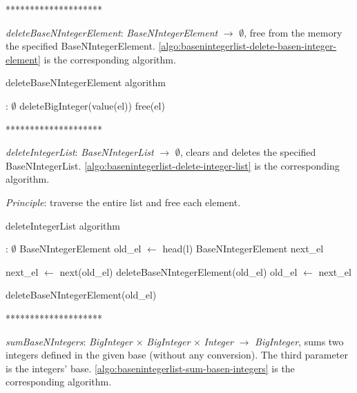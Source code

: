 \documentclass[book, nodocumentinfo]{upmethodology-document}
\newcommand{\separator}{\centerline{********************}}
\begin{document}
\separator

\emph{deleteBaseNIntegerElement}: \emph{BaseNIntegerElement} \(\rightarrow\) \(\emptyset\),
free from the memory the specified BaseNIntegerElement.
\ref{algo:basenintegerlist-delete-basen-integer-element} is the corresponding algorithm.

\begin{algorithm}[H]
    \caption{deleteBaseNIntegerElement algorithm}
    \label{algo:basenintegerlist-delete-basen-integer-element}

    \begin{algorithmic}
         : \(\emptyset\)
            \State deleteBigInteger(value(el))
            \State free(el)
        \EndFunction
    \end{algorithmic}
\end{algorithm}

\separator

\emph{deleteIntegerList}: \emph{BaseNIntegerList} \(\rightarrow\) \(\emptyset\),
clears and deletes the specified BaseNIntegerList.
\ref{algo:basenintegerlist-delete-integer-list} is the corresponding algorithm.

\emph{Principle}: traverse the entire list and free each element.

\newpage

\begin{algorithm}[H]
    \caption{deleteIntegerList algorithm}
    \label{algo:basenintegerlist-delete-integer-list}

    \begin{algorithmic}
         : \(\emptyset\)
                \State BaseNIntegerElement old\_el \(\leftarrow\) head(l)
                \State BaseNIntegerElement next\_el

                    \State next\_el \(\leftarrow\) next(old\_el)
                    \State deleteBaseNIntegerElement(old\_el)
                    \State old\_el \(\leftarrow\) next\_el
                \EndWhile

                \State deleteBaseNIntegerElement(old\_el)
            \EndIf
        \EndFunction
    \end{algorithmic}
\end{algorithm}

\separator

\emph{sumBaseNIntegers}: \emph{BigInteger} \(×\) \emph{BigInteger} \(×\) \emph{Integer} \(\rightarrow\) \emph{BigInteger},
sums two integers defined in the given base (without any conversion).
The third parameter is the integers' base.
\ref{algo:basenintegerlist-sum-basen-integers} is the corresponding algorithm.
\end{document}
